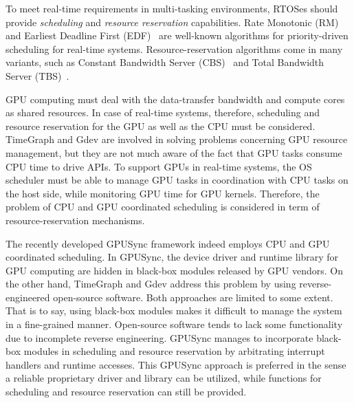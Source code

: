 To meet real-time requirements in multi-tasking environments, RTOSes should provide \textit{scheduling} and \textit{resource reservation} capabilities.
Rate Monotonic (RM) and Earliest Deadline First (EDF)~\cite{sched:ll} are well-known algorithms for priority-driven scheduling for real-time systems.
Resource-reservation algorithms come in many variants, such as Constant Bandwidth Server (CBS)~\cite{rr:cbs} and Total Bandwidth Server (TBS)~\cite{rr:tbs2}.

GPU computing must deal with the data-transfer bandwidth and compute cores as shared resources.
In case of real-time systems, therefore, scheduling and resource reservation for the GPU as well as the CPU must be considered.
TimeGraph and Gdev are involved in solving problems concerning GPU resource management, but they are not much aware of the fact that GPU tasks consume CPU time to drive APIs.
To support GPUs in real-time systems, the OS scheduler must be able to manage GPU tasks in coordination with CPU tasks on the host side, while monitoring GPU time for GPU kernels.
Therefore, the problem of CPU and GPU coordinated scheduling is considered in term of resource-reservation mechanisms.

The recently developed GPUSync framework indeed employs CPU and GPU coordinated scheduling.
In GPUSync, the device driver and runtime library for GPU computing are hidden in black-box modules released by GPU vendors.
On the other hand, TimeGraph and Gdev address this problem by using reverse-engineered open-source software.
Both approaches are limited to some extent.
That is to say, using black-box modules makes it difficult to manage the system in a fine-grained manner.
Open-source software tends to lack some functionality due to incomplete reverse engineering.
GPUSync manages to incorporate black-box modules in scheduling and resource reservation by arbitrating interrupt handlers and runtime accesses.
This GPUSync approach is preferred in the sense a reliable proprietary driver and library can be utilized, while functions for scheduling and resource reservation can still be provided.

